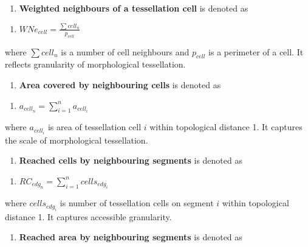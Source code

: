 \documentclass[
  letterpaper,
  DIV=11,
  numbers=noendperiod]{scrartcl}
\providecommand{\tightlist}{%
  \setlength{\itemsep}{0pt}\setlength{\parskip}{0pt}}\usepackage{longtable,booktabs,array}
\begin{document}
\begin{enumerate}
\def\labelenumi{\arabic{enumi}.}
\setcounter{enumi}{26}
\tightlist
\item
  \textbf{Weighted neighbours of a tessellation cell} is denoted as
\end{enumerate}

\begin{enumerate}
\def\labelenumi{(\arabic{enumi})}
\setcounter{enumi}{26}
\tightlist
\item
  \(WNe_{cell} = \frac{\sum cell_n}{p_{cell}}\)
\end{enumerate}

where \(\sum cell_n\) is a number of cell neighbours and \(p_{cell}\) is
a perimeter of a cell. It reflects granularity of morphological
tessellation.

\begin{enumerate}
\def\labelenumi{\arabic{enumi}.}
\setcounter{enumi}{27}
\tightlist
\item
  \textbf{Area covered by neighbouring cells} is denoted as
\end{enumerate}

\begin{enumerate}
\def\labelenumi{(\arabic{enumi})}
\setcounter{enumi}{27}
\tightlist
\item
  \(a_{cell_n} = \sum_{i=1}^{n} a_{cell_i}\)
\end{enumerate}

where \(a_{cell_i}\) is area of tessellation cell \(i\) within
topological distance 1. It captures the scale of morphological
tessellation.

\begin{enumerate}
\def\labelenumi{\arabic{enumi}.}
\setcounter{enumi}{28}
\tightlist
\item
  \textbf{Reached cells by neighbouring segments} is denoted as
\end{enumerate}

\begin{enumerate}
\def\labelenumi{(\arabic{enumi})}
\setcounter{enumi}{28}
\tightlist
\item
  \(RC_{edg_n} = \sum_{i=1}^{n} cells_{edg_i}\)
\end{enumerate}

where \(cells_{edg_i}\) is number of tessellation cells on segment \(i\)
within topological distance 1. It captures accessible granularity.

\begin{enumerate}
\def\labelenumi{\arabic{enumi}.}
\setcounter{enumi}{29}
\tightlist
\item
  \textbf{Reached area by neighbouring segments} is denoted as
\end{enumerate}
\end{document}
